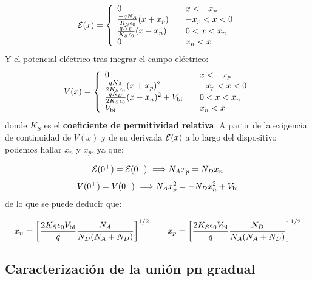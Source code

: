 \begin{equation}
    \mathcal{E} (x) = \left\lbrace  \begin{array}{ll}
    0 & \quad x < -x_p \\
    \frac{-q N_A}{K_S\epsilon_0} (x+x_p) & \quad   -x_p< x < 0  \\
    \frac{q N_D}{K_S\epsilon_0} (x-x_n)& \quad 0< x < x_n \\
    0 & \quad x_n < x    \\ 
    \end{array}  \right.
\end{equation}
Y el potencial eléctrico tras inegrar el campo eléctrico: 
\begin{equation}
    V (x) = \left\lbrace  \begin{array}{ll}
    0 & \quad x < -x_p \\
    \frac{q N_A}{2K_S\epsilon_0} (x+x_p)^2 & \quad   -x_p< x < 0  \\
    \frac{q N_D}{2K_S\epsilon_0} (x-x_n)^2 + V_{\text{bi}} & \quad 0< x < x_n \\
    V_{\text{bi}} & \quad x_n < x    \\
    \end{array}  \right.
\end{equation}
donde $K_S$ es  el \textbf{coeficiente de permitividad relativa}. A partir de la exigencia de continuidad de $V(x)$ y de su derivada $\mathcal{E}(x)$ a lo largo del dispositivo podemos hallar $x_n$ y $x_p$, ya que: 

\begin{equation}
    \Ecal(0^+) = \Ecal(0^-) \ \Longrightarrow N_A x_p = N_D x_n
\end{equation}
\begin{equation}
    V(0^+) = V(0^-) \ \Longrightarrow N_A x_p^2 = -N_D x_n^2 + V_{\text{bi}}
\end{equation}
de lo que se puede deducir que: 

\begin{equation}
    x_n = \left[ \frac{2K_S\epsilon_0 V_{\text{bi}}}{q} \frac{N_A}{N_D(N_A+N_D)} \right]^{1/2} \qquad 
    x_p = \left[ \frac{2K_S\epsilon_0 V_{\text{bi}}}{q} \frac{N_D}{N_A(N_A+N_D)} \right]^{1/2}
\end{equation}

\subsection{Caracterización de la unión pn gradual}


